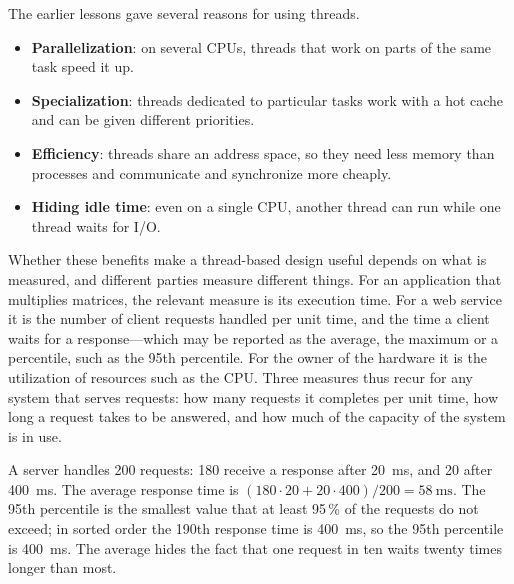 \documentclass[../main.tex]{subfiles}
\begin{document}
The earlier lessons gave several reasons for using
threads.
\begin{itemize}
  \item \textbf{Parallelization}: on several CPUs, threads that work on
    parts of the same task speed it up.
  \item \textbf{Specialization}: threads dedicated to particular tasks work
    with a hot cache and can be given different priorities.
  \item \textbf{Efficiency}: threads share an address space, so they need
    less memory than processes and communicate and synchronize more cheaply.
  \item \textbf{Hiding idle time}: even on a single CPU, another thread can
    run while one thread waits for I/O.
\end{itemize}
Whether these benefits make a thread-based design useful depends on what is
measured, and different parties measure different things.  For an
application that multiplies matrices, the relevant measure is its execution
time.  For a web service it is the number of client requests handled per
unit time, and the time a client waits for a response---which may be
reported as the average, the maximum or a percentile, such as the 95th
percentile.  For the owner of the hardware it is the utilization of
resources such as the CPU.  Three measures thus recur for any system that
serves requests: how many requests it completes per unit time, how long a
request takes to be answered, and how much of the capacity of the system is
in use.

\begin{example}
  A server handles 200 requests: 180 receive a response after
  \SI{20}{\milli\second}, and 20 after \SI{400}{\milli\second}.  The average
  response time is $(180 \cdot 20 + 20 \cdot 400)/200 =
  \SI{58}{\milli\second}$.  The 95th percentile is the smallest value that
  at least 95\,\% of the requests do not exceed; in sorted order the 190th
  response time is \SI{400}{\milli\second}, so the 95th percentile is
  \SI{400}{\milli\second}.
  The average hides the fact that one request in
  ten waits twenty times longer than most.
\end{example}
\end{document}
